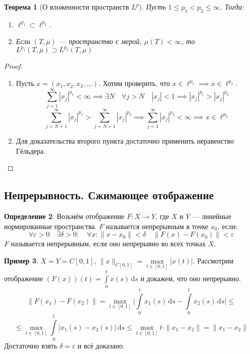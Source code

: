 \documentclass[11pt,openany,a4paper]{scrartcl}
\theoremstyle{plain}
\newtheorem{theorem}{Теорема}[subsection]
\theoremstyle{definition}
\newtheorem{definition}[theorem]{Определение}
\newtheorem{example}[theorem]{Пример}
\newcommand{\dif}{\, \mathrm d}
\begin{document}
\begin{theorem}[О вложенности пространств $L^p$]
Пусть $1 \leqslant p_1 < p_2 \leqslant \infty$. Тогда:
    \begin{enumerate}
        \item $\ell^{p_1} \subset \ell^{p_2}$.
        \item Если $(T, \mu)$ — пространство с мерой, $\mu(T) < \infty$, то
        $L^{p_1}(T, \mu) \supset L^{p_2}(T, \mu)$
    \end{enumerate}
\end{theorem}
\pagebreak
\begin{proof}
\mbox{}
    \begin{enumerate}
        \item Пусть $x = (x_1, x_2, x_3, \ldots)$. Хотим проверить, что
        $x \in \ell^{p_1} \implies x \in \ell^{p_2}$.
        $$
        \sum\limits_{j = 1}^\infty |x_j|^{p_1} < \infty \implies
        \exists N\quad \forall j > N\quad |x_j| < 1 \implies
        |x_j|^{p_1} > |x_j|^{p_2}
        $$
        $$
        \sum\limits_{j = N + 1}^\infty |x_j|^{p_1} >
        \sum\limits_{j = N + 1}^\infty |x_j|^{p_2} \implies
        \sum\limits_{j = 1}^\infty |x_j|^{p_2} < \infty \implies x \in \ell^{p_2}
        $$
        \item Для доказательства второго пункта достаточно применить неравенство 
        Гёльдера.
    \end{enumerate}
\end{proof}

\subsection{Непрерывность. Сжимающее отображение}

\begin{definition}
    Возьмём отображение $F: X \to Y$, где $X$ и $Y$ — линейные нормированные
    пространства. $F$ называется непрерывным в точке $x_0$, если:
    $$
    \forall \varepsilon > 0\quad
    \exists \delta > 0:\quad \forall x: \|x - x_0\| < \delta\quad
    \|F(x) -F(x_0)\| < \varepsilon
    $$
    $F$ называется непрерывным, если оно непрерывно во всех точках $X$.
\end{definition}

\begin{example}
        $X = Y = C[0, 1]$, $\|x\|_{C[0, 1]} =
        \max\limits_{t \in [0, 1]} |x(t)|$. Рассмотрим отображение
        $(F(x))(t) = \int\limits_0^t x(s)\dif s$ и докажем, что оно 
        непрерывно.
        $$
        \|F(x_1) - F(x_2)\| = \max_{t \in [0, 1]}
        \bigg|\int\limits_0^t x_1(s)\dif s - \int\limits_0^t x_2(s)\dif s\bigg|
        \leqslant
        $$
        $$
        \leqslant
        \max_{t \in [0, 1]} \int\limits_0^t |x_1(s) - x_2(s)|\dif s \leqslant
        \max_{t \in [0, 1]} t \cdot \|x_1 - x_2\| = \|x_1 - x_2\|
        $$
        Достаточно взять $\delta = \varepsilon$ и всё доказано.
\end{example}
\end{document}

